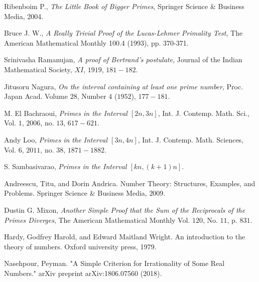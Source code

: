 \documentclass{subfiles}
\begin{document}
\begin{thebibliography}{99}
		 Ribenboim P., \textit{The Little Book of Bigger Primes}, Springer Science \& Business Media, 2004.
		
		 Bruce J. W., \textit{A Really Trivial Proof of the Lucas-Lehmer Primality Test}, The American Mathematical Monthly 100.4 (1993), pp. 370-371.
		
		 Srinivasha Ramanujan, \textit{A proof of Bertrand’s postulate}, Journal of the Indian Mathematical Society, $XI$, $1919$, $181-182$.
		
		 Jitusoru Nagura, \textit{On the interval containing at least one prime number}, Proc. Japan Acad. Volume $28$, Number $4$ ($1952$), $177-181$.
		
		 M. El Bachraoui, \textit{Primes in the Interval $[2n, 3n]$}, Int. J. Contemp. Math. Sci., Vol. $1$, $2006$, no. $13$, $617-621$.
		
		 Andy Loo, \textit{Primes in the Interval $[3n, 4n]$}, Int. J. Contemp. Math. Sciences, Vol. $6$, $2011$, no. $38$, $1871 - 1882$.
		
		 S. Sambasivarao, \textit{Primes in the Interval $[kn, (k+1)n]$}.
		
		 Andreescu, Titu, and Dorin Andrica. Number Theory: Structures, Examples, and Problems. Springer Science \& Business Media, $2009$.
		
		 Dustin G. Mixon, \textit{Another Simple Proof that the Sum of the Reciprocals of the Primes Diverges}, The American Mathematical Monthly Vol. $120$, No. $11$, p. $831$.
		
		
		 Hardy, Godfrey Harold, and Edward Maitland Wright. An introduction to the theory of numbers. Oxford university press, 1979.
		
		 Nasehpour, Peyman. "A Simple Criterion for Irrationality of Some Real Numbers." arXiv preprint arXiv:1806.07560 (2018).
	\end{thebibliography}
	
	
\end{document}
